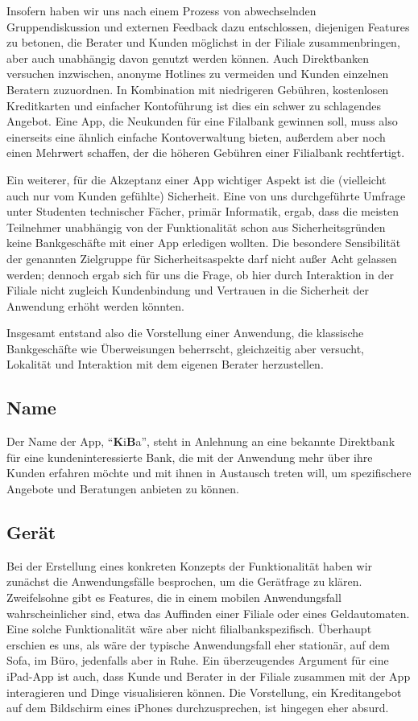 
Insofern haben wir uns nach einem Prozess von abwechselnden Gruppendiskussion und externen Feedback dazu entschlossen, diejenigen Features zu betonen, die Berater und Kunden möglichst in der Filiale zusammenbringen, aber auch unabhängig davon genutzt werden können. Auch Direktbanken versuchen inzwischen, anonyme Hotlines zu vermeiden und Kunden einzelnen Beratern zuzuordnen. In Kombination mit niedrigeren Gebühren, kostenlosen Kreditkarten und einfacher Kontoführung ist dies ein schwer zu schlagendes Angebot. Eine App, die Neukunden für eine Filalbank gewinnen soll, muss also einerseits eine ähnlich einfache Kontoverwaltung bieten, außerdem aber noch einen Mehrwert schaffen, der die höheren Gebühren einer Filialbank rechtfertigt.

Ein weiterer, für die Akzeptanz einer App wichtiger Aspekt ist die (vielleicht auch nur vom Kunden gefühlte) Sicherheit. Eine von uns durchgeführte Umfrage unter Studenten technischer Fächer, primär Informatik, ergab, dass die meisten Teilnehmer unabhängig von der Funktionalität schon aus Sicherheitsgründen keine Bankgeschäfte mit einer App erledigen wollten. Die besondere Sensibilität der genannten Zielgruppe für Sicherheitsaspekte darf nicht außer Acht gelassen werden; dennoch ergab sich für uns die Frage, ob hier durch Interaktion in der Filiale nicht zugleich Kundenbindung und Vertrauen in die Sicherheit der Anwendung erhöht werden könnten. 

Insgesamt entstand also die Vorstellung einer Anwendung, die klassische Bankgeschäfte wie Überweisungen beherrscht, gleichzeitig aber versucht, Lokalität und Interaktion mit dem eigenen Berater herzustellen. 

\subsection{Name}
    Der Name der App, "`\textbf{K}i\textbf{B}a"', steht in Anlehnung an eine bekannte Direktbank für eine kundeninteressierte Bank, die mit der Anwendung mehr über ihre Kunden erfahren möchte und mit ihnen in Austausch treten will, um spezifischere Angebote und Beratungen anbieten zu können.
    
\subsection{Gerät}
    Bei der Erstellung eines konkreten Konzepts der Funktionalität haben wir zunächst die Anwendungsfälle besprochen, um die Gerätfrage zu klären. Zweifelsohne gibt es Features, die in einem mobilen Anwendungsfall wahrscheinlicher sind, etwa das Auffinden einer Filiale oder eines Geldautomaten. Eine solche Funktionalität wäre aber nicht filialbankspezifisch. Überhaupt erschien es uns, als wäre der typische Anwendungsfall eher stationär, auf dem Sofa, im Büro, jedenfalls aber in Ruhe. Ein überzeugendes Argument für eine iPad-App ist auch, dass Kunde und Berater in der Filiale zusammen mit der App interagieren und Dinge visualisieren können. Die Vorstellung, ein Kreditangebot auf dem Bildschirm eines iPhones durchzusprechen, ist hingegen eher absurd. 
    
